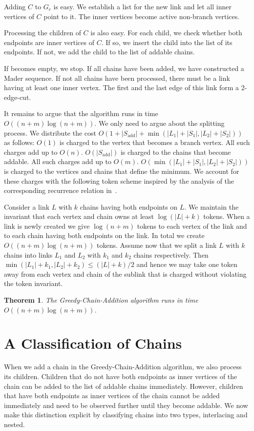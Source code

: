 \documentclass[paper=a4]{scrartcl}
\newtheorem{theorem}{Theorem}
\newcommand{\abs}[1]{| #1 |}
\begin{document}
Adding $C$ to $G_c$ is easy. We establish a list for the new link and let all inner vertices of $C$ point to it. The inner vertices become active non-branch vertices.

Processing the children of $C$ is also easy. For each child, we check whether both endpoints are inner vertices of $C$. If so, we insert the child into the list of its endpoints. If not, we add the child to the list of addable chains.


If \cL becomes empty, we stop. If all chains have been added, we have constructed a Mader sequence. If not all chains have been processed, there must be a link having at least one inner vertex. The first and the last edge of this link form a 2-edge-cut.

It remains to argue that the algorithm runs in time $O((n + m) \log (n + m))$. We only need to argue about the splitting process. We distribute the cost $O(1 + \abs{S_{\text{add}}} + \min(\abs{L_1} + \abs{S_1},\abs{L_2} + \abs{S_2}))$ as follows: $O(1)$ is charged to the vertex that becomes a branch vertex. All such charges add up to $O(n)$. $O(\abs{S_{\text{add}}})$ is charged to the chains that become addable. All such charges add up to $O(m)$. $O(\min(\abs{L_1} + \abs{S_1},\abs{L_2} + \abs{S_2}))$ is charged to the vertices and chains that define the minimum. We account for these charges with the following token scheme inspired by the analysis of the corresponding recurrence relation in~\cite{Me3}.


Consider a link $L$ with $k$ chains having both endpoints on $L$. We maintain the invariant that each vertex and chain owns at least $\log (\abs{L} + k)$ tokens. When a link is newly created we give $\log(n + m)$ tokens to each vertex of the link and to each chain having both endpoints on the link. In total we create $O((n+m)\log(n+m))$ tokens. Assume now that we split a link $L$ with $k$ chains into links $L_1$ and $L_2$ with $k_1$ and $k_2$ chains respectively. Then $\min(\abs{L_1} + k_1,\abs{L_2} + k_2) \le (\abs{L} + k)/2$ and hence we may take one token away from each vertex and chain of the sublink that is charged without violating the token invariant.

\begin{theorem} The Greedy-Chain-Addition algorithm runs in time $O((n + m) \log (n + m))$.
\end{theorem}

\section{A Classification of Chains}\label{A Classification of Chains}
When we add a chain in the Greedy-Chain-Addition algorithm, we also process its children. Children that do not have both endpoints as inner vertices of the chain can be added to the list of addable chains immediately. However, children that have both endpoints as inner vertices of the chain cannot be added immediately and need to be observed further until they become addable. We now make this distinction explicit by classifying chains into two types, interlacing and nested.
\end{document}
